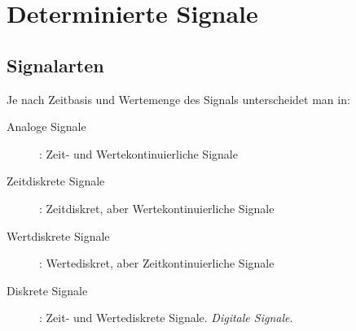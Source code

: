 \chapter{Determinierte Signale}
\label{chap:determinierte-signale}


\section{Signalarten}
\label{sec:signalarten}

Je nach Zeitbasis und Wertemenge des Signals unterscheidet man in:

\begin{description}
    \item[Analoge Signale]: Zeit- und Wertekontinuierliche Signale
    \item[Zeitdiskrete Signale]: Zeitdiskret, aber Wertekontinuierliche Signale
    \item[Wertdiskrete Signale]: Wertediskret, aber Zeitkontinuierliche Signale
    \item[Diskrete Signale]: Zeit- und Wertediskrete Signale. \textit{Digitale Signale}.   
\end{description}


